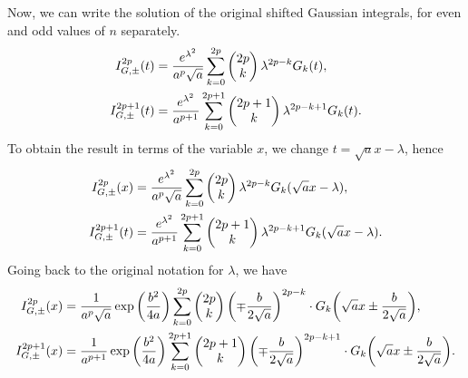 \documentclass[aps,prl,preprint,groupedaddress,10pt]{revtex4-2}
\begin{document}
Now, we can write the solution of the original shifted Gaussian integrals, for even and
odd values of $n$ separately.
\begin{equation}
    \begin{split}
        I_{G,\pm}^{2p}(t)&=\frac{e^{\lambda^2}}{a^p\sqrt{a}}\sum_{k=0}^{2p}\pmqty{2p\\k}
        \lambda^{2p-k}G_{k}(t),\\
        I_{G,\pm}^{2p+1}(t)&=\frac{e^{\lambda^2}}{a^{p+1}}\sum_{k=0}^{2p+1}
        \pmqty{2p+1\\k}\lambda^{2p-k+1}G_{k}(t).
    \end{split}
\end{equation}
To obtain the result in terms of the variable $x$, we change $t=\sqrt{a}x-\lambda$,
hence
\begin{equation}
    \begin{split}
        I_{G,\pm}^{2p}(x)&=\frac{e^{\lambda^2}}{a^p\sqrt{a}}\sum_{k=0}^{2p}\pmqty{2p\\k}
        \lambda^{2p-k}G_{k}(\sqrt{a}x-\lambda),\\
        I_{G,\pm}^{2p+1}(t)&=\frac{e^{\lambda^2}}{a^{p+1}}\sum_{k=0}^{2p+1}
        \pmqty{2p+1\\k}\lambda^{2p-k+1}G_{k}(\sqrt{a}x-\lambda).
    \end{split}
\end{equation}
Going back to the original notation for $\lambda$, we have
\begin{equation}
    \begin{split}
        I_{G,\pm}^{2p}(x)&=\frac{1}{a^p\sqrt{a}}\exp\pqty{\frac{b^2}{4a}}
        \sum_{k=0}^{2p}\pmqty{2p\\k}
        \pqty{\mp\frac{b}{2\sqrt{a}}}^{2p-k}
        \cdot G_{k}\pqty{\sqrt{a}x\pm\frac{b}{2\sqrt{a}}},\\
        I_{G,\pm}^{2p+1}(x)&=\frac{1}{a^{p+1}}\exp\pqty{\frac{b^2}{4a}}\sum_{k=0}^{2p+1}
        \pmqty{2p+1\\k}\pqty{\mp\frac{b}{2\sqrt{a}}}^{2p-k+1}
        \cdot G_{k}\pqty{\sqrt{a}x\pm\frac{b}{2\sqrt{a}}}.
    \end{split}
\end{equation}
\end{document}
